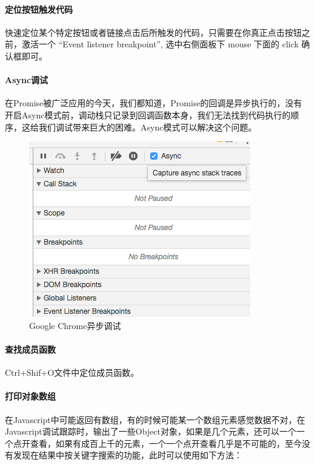\documentclass[letter]{book}
\begin{document}
\paragraph{定位按钮触发代码}

快速定位某个特定按钮或者链接点击后所触发的代码，只需要在你真正点击按钮之前，激活一个 “Event listener breakpoint”, 选中右侧面板下 mouse 下面的 click 确认框即可。

\paragraph{Async调试}

在Promise被广泛应用的今天，我们都知道，Promise的回调是异步执行的，没有开启Async模式前，调动栈只记录到回调函数本身，我们无法找到代码执行的顺序，这给我们调试带来巨大的困难。Async模式可以解决这个问题。

\begin{figure}[htbp]
	\centering
	\includegraphics[scale=0.9]{chromeasyncdebugging.png}
	\caption{Google Chrome异步调试}
	\label{fig:chromeasyncdebugging}
\end{figure}

\paragraph{查找成员函数}

Ctrl+Shif+O文件中定位成员函数。

\paragraph{打印对象数组}

在Javascript中可能返回有数组，有的时候可能某一个数组元素感觉数据不对，在Javascript调试跟踪时，输出了一些Object对象，如果是几个元素，还可以一个一个点开查看，如果有成百上千的元素，一个一个点开查看几乎是不可能的，至今没有发现在结果中按关键字搜索的功能，此时可以使用如下方法：
\end{document}
